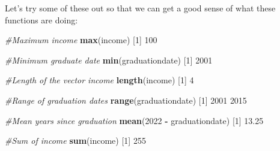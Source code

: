 \documentclass[
]{book}
\newenvironment{Shaded}{\begin{snugshade}}{\end{snugshade}}
\newcommand{\CommentTok}[1]{\textcolor[rgb]{0.56,0.35,0.01}{\textit{#1}}}
\newcommand{\DecValTok}[1]{\textcolor[rgb]{0.00,0.00,0.81}{#1}}
\newcommand{\FloatTok}[1]{\textcolor[rgb]{0.00,0.00,0.81}{#1}}
\newcommand{\FunctionTok}[1]{\textcolor[rgb]{0.13,0.29,0.53}{\textbf{#1}}}
\newcommand{\NormalTok}[1]{#1}
\newcommand{\SpecialCharTok}[1]{\textcolor[rgb]{0.81,0.36,0.00}{\textbf{#1}}}
\begin{document}
Let's try some of these out so that we can get a good sense of what these functions are doing:

\begin{Shaded}
\begin{Highlighting}[]
\CommentTok{\#Maximum income}
\FunctionTok{max}\NormalTok{(income)}
\NormalTok{[}\DecValTok{1}\NormalTok{] }\DecValTok{100}
\end{Highlighting}
\end{Shaded}

\begin{Shaded}
\begin{Highlighting}[]
\CommentTok{\#Minimum graduate date}
\FunctionTok{min}\NormalTok{(graduationdate)}
\NormalTok{[}\DecValTok{1}\NormalTok{] }\DecValTok{2001}
\end{Highlighting}
\end{Shaded}

\begin{Shaded}
\begin{Highlighting}[]
\CommentTok{\#Length of the vector income}
\FunctionTok{length}\NormalTok{(income)}
\NormalTok{[}\DecValTok{1}\NormalTok{] }\DecValTok{4}
\end{Highlighting}
\end{Shaded}

\begin{Shaded}
\begin{Highlighting}[]
\CommentTok{\#Range of graduation dates}
\FunctionTok{range}\NormalTok{(graduationdate)}
\NormalTok{[}\DecValTok{1}\NormalTok{] }\DecValTok{2001} \DecValTok{2015}
\end{Highlighting}
\end{Shaded}

\begin{Shaded}
\begin{Highlighting}[]
\CommentTok{\#Mean years since graduation}
\FunctionTok{mean}\NormalTok{(}\DecValTok{2022} \SpecialCharTok{{-}}\NormalTok{ graduationdate)}
\NormalTok{[}\DecValTok{1}\NormalTok{] }\FloatTok{13.25}
\end{Highlighting}
\end{Shaded}

\begin{Shaded}
\begin{Highlighting}[]
\CommentTok{\#Sum of income}
\FunctionTok{sum}\NormalTok{(income)}
\NormalTok{[}\DecValTok{1}\NormalTok{] }\DecValTok{255}
\end{Highlighting}
\end{Shaded}
\end{document}
